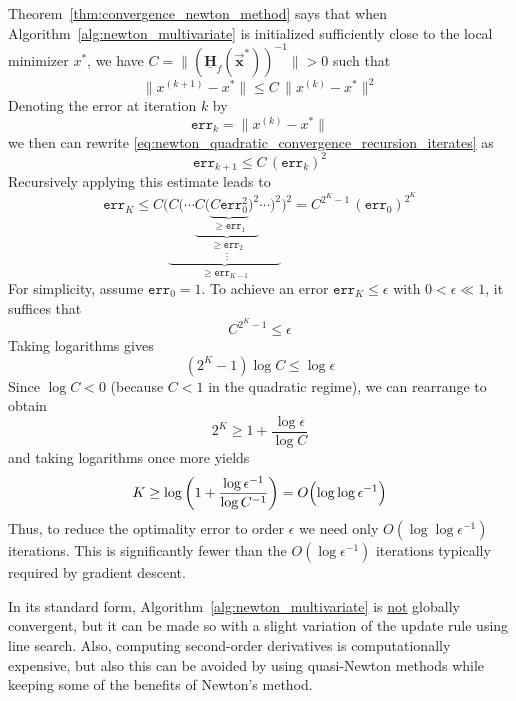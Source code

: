 \documentclass[9pt, headings=standardclasses, parskip=half]{scrartcl}
\renewcommand{\emph}[1]{\textcolor{mypurple}{#1}}
\newcommand{\matr}[1]{\underline{\boldsymbol{#1}}}
\newcommand{\vect}[1]{\vec{\boldsymbol{#1}}}
\begin{document}
Theorem~\ref{thm:convergence_newton_method} says that when Algorithm~\ref{alg:newton_multivariate} is initialized sufficiently close to the local minimizer \(x^{*}\), we have \(C = \|(\matr{H}_{f}(\vect{x}^{*}))^{-1}\| > 0\) such that
\begin{equation}\label{eq:newton_quadratic_convergence_recursion_iterates}
\|x^{(k+1)}-x^{*}\|\le C\,\|x^{(k)}-x^{*}\|^{2} %
\end{equation}
Denoting the error at iteration \(k\) by
\[
\texttt{err}_{k}=\|x^{(k)}-x^{*}\| %
\]
we then can rewrite \eqref{eq:newton_quadratic_convergence_recursion_iterates} as
\begin{equation}\label{eq:newton_quadratic_convergence_recursion_error}
\texttt{err}_{k+1}\le C\,(\texttt{err}_{k})^{2} %
\end{equation}
Recursively applying this estimate leads to
\[
\texttt{err}_{K} \le C \Bigg( 
\underbrace{
C \bigg( 
\underset{\vdots}{
\cdots 
\underbrace{
C \Big( 
\underbrace{
C \texttt{err}_{0}^{2} 
}_{\geq \texttt{err}_{1}}
\Big)^{2} 
}_{\geq \texttt{err}_{2}}
\cdots 
}
\bigg)^{2} 
}_{\geq \texttt{err}_{K-1}}
\Bigg)^{2}
=
C^{2^{K}-1}\,(\texttt{err}_{0})^{2^{K}} %
\]
For simplicity, assume \(\texttt{err}_{0}=1\). To achieve an error \(\texttt{err}_{K}\le\epsilon\) with \(0<\epsilon\ll 1\), it suffices that
\[
C^{2^{K}-1}\le \epsilon
\]
Taking logarithms gives
\[
\left(2^{K}-1\right)\log C \le \log \epsilon
\]
Since \(\log C<0\) (because \(C<1\) in the quadratic regime), we can rearrange to obtain
\[
2^{K}\ge 1+\frac{\log \epsilon}{\log C}
\]
and taking logarithms once more yields
\[
K \ge \log\left(1+\frac{\log \epsilon^{-1}}{\log C^{-1}}\right)=O\Bigl(\log \log \epsilon^{-1}\Bigr)
\]
Thus, to reduce the optimality error to order \(\epsilon\) we need only {\color{red}\(O(\log \log \epsilon^{-1})\)} iterations. 
This is significantly fewer than the \(O(\log \epsilon^{-1})\) iterations typically required by gradient descent.

In its standard form, Algorithm~\ref{alg:newton_multivariate} is \underline{not} globally convergent, but it can be made so with a slight variation of the update rule using \emph{line search}.
Also, computing second-order derivatives is computationally expensive, but also this can be avoided by using \emph{quasi-Newton methods} while keeping some of the benefits of Newton's method.
  
\end{document}
